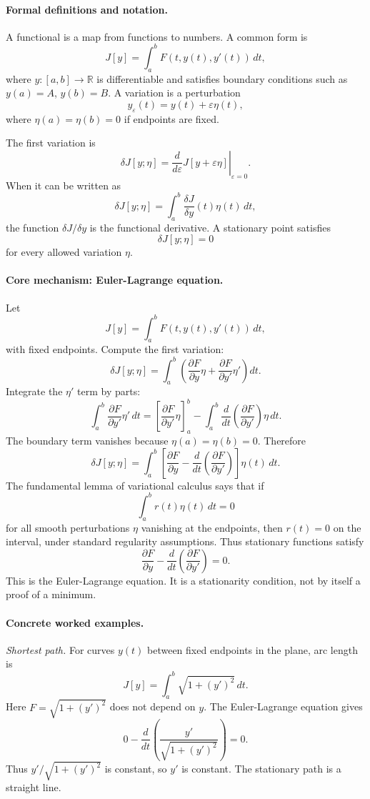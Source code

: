 \paragraph{Formal definitions and notation.}
A functional is a map from functions to numbers. A common form is
\[
J[y]=\int_a^b F(t,y(t),y'(t))\,dt,
\]
where \(y:[a,b]\to\mathbb R\) is differentiable and satisfies boundary conditions such as \(y(a)=A\), \(y(b)=B\). A variation is a perturbation
\[
y_\varepsilon(t)=y(t)+\varepsilon\eta(t),
\]
where \(\eta(a)=\eta(b)=0\) if endpoints are fixed.

The first variation is
\[
\delta J[y;\eta]
=\left.\frac{d}{d\varepsilon}J[y+\varepsilon\eta]\right|_{\varepsilon=0}.
\]
When it can be written as
\[
\delta J[y;\eta]=\int_a^b \frac{\delta J}{\delta y}(t)\eta(t)\,dt,
\]
the function \(\delta J/\delta y\) is the functional derivative. A stationary point satisfies
\[
\delta J[y;\eta]=0
\]
for every allowed variation \(\eta\).

\paragraph{Core mechanism: Euler-Lagrange equation.}
Let
\[
J[y]=\int_a^b F(t,y(t),y'(t))\,dt,
\]
with fixed endpoints. Compute the first variation:
\[
\delta J[y;\eta]
=\int_a^b
\left(
\frac{\partial F}{\partial y}\eta
+\frac{\partial F}{\partial y'}\eta'
\right)dt.
\]
Integrate the \(\eta'\) term by parts:
\[
\int_a^b \frac{\partial F}{\partial y'}\eta'\,dt
=
\left[\frac{\partial F}{\partial y'}\eta\right]_a^b
-\int_a^b
\frac{d}{dt}\left(\frac{\partial F}{\partial y'}\right)\eta\,dt.
\]
The boundary term vanishes because \(\eta(a)=\eta(b)=0\). Therefore
\[
\delta J[y;\eta]
=\int_a^b
\left[
\frac{\partial F}{\partial y}
-
\frac{d}{dt}\left(\frac{\partial F}{\partial y'}\right)
\right]\eta(t)\,dt.
\]
The fundamental lemma of variational calculus says that if
\[
\int_a^b r(t)\eta(t)\,dt=0
\]
for all smooth perturbations \(\eta\) vanishing at the endpoints, then \(r(t)=0\) on the interval, under standard regularity assumptions. Thus stationary functions satisfy
\[
\boxed{
\frac{\partial F}{\partial y}
-
\frac{d}{dt}\left(\frac{\partial F}{\partial y'}\right)=0.
}
\]
This is the Euler-Lagrange equation. It is a stationarity condition, not by itself a proof of a minimum.

\paragraph{Concrete worked examples.}
\emph{Shortest path.} For curves \(y(t)\) between fixed endpoints in the plane, arc length is
\[
J[y]=\int_a^b \sqrt{1+(y')^2}\,dt.
\]
Here \(F=\sqrt{1+(y')^2}\) does not depend on \(y\). The Euler-Lagrange equation gives
\[
0-\frac{d}{dt}\left(\frac{y'}{\sqrt{1+(y')^2}}\right)=0.
\]
Thus \(y'/\sqrt{1+(y')^2}\) is constant, so \(y'\) is constant. The stationary path is a straight line.

